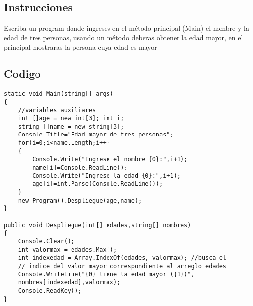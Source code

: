 \documentclass[letterpaper, 12pt]{article}
\begin{document}
\thispagestyle{fancy}
    \subsection*{Instrucciones}
    Escriba un program donde ingreses en el método principal (Main) el nombre y la edad de tres personas, usando un método deberas obtener la edad mayor,
    en el principal mostraras la persona cuya edad es mayor
    \subsection*{Codigo}
    \begin{verbatim}
static void Main(string[] args)
{
    //variables auxiliares
    int []age = new int[3]; int i;
    string []name = new string[3];
    Console.Title="Edad mayor de tres personas";
    for(i=0;i<name.Length;i++)
    {
        Console.Write("Ingrese el nombre {0}:",i+1);
        name[i]=Console.ReadLine();
        Console.Write("Ingrese la edad {0}:",i+1);
        age[i]=int.Parse(Console.ReadLine());
    }
    new Program().Despliegue(age,name);
} 
        
public void Despliegue(int[] edades,string[] nombres)
{
    Console.Clear();
    int valormax = edades.Max();
    int indexedad = Array.IndexOf(edades, valormax); //busca el
    // indice del valor mayor correspondiente al arreglo edades
    Console.WriteLine("{0} tiene la edad mayor ({1})",
    nombres[indexedad],valormax);
    Console.ReadKey();
}
    \end{verbatim}
\end{document}
